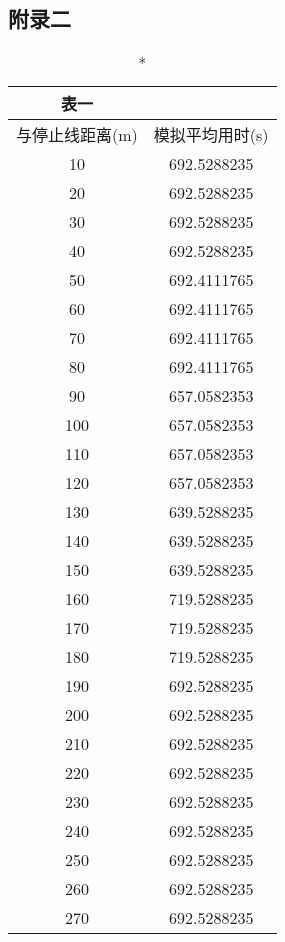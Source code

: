\documentclass[a4paper,12pt]{article}
\numberwithin{equation}{section}
\begin{document}
\begin{appendix}
\section{附录二}
%
\begin{center}
\begin{longtable}{cc}\caption*{表一}
		\\\hline
		与停止线距离(m) & 模拟平均用时(s) \\ \hline
		10 & 692.5288235 \\ \hline
		20 & 692.5288235 \\ \hline
		30 & 692.5288235 \\ \hline
		40 & 692.5288235 \\ \hline
		50 & 692.4111765 \\ \hline
		60 & 692.4111765 \\ \hline
		70 & 692.4111765 \\ \hline
		80 & 692.4111765 \\ \hline
		90 & 657.0582353 \\ \hline
		100 & 657.0582353 \\ \hline
		110 & 657.0582353 \\ \hline
		120 & 657.0582353 \\ \hline
		130 & 639.5288235 \\ \hline
		140 & 639.5288235 \\ \hline
		150 & 639.5288235 \\ \hline
		160 & 719.5288235 \\ \hline
		170 & 719.5288235 \\ \hline
		180 & 719.5288235 \\ \hline
		190 & 692.5288235 \\ \hline
		200 & 692.5288235 \\ \hline
		210 & 692.5288235 \\ \hline
		220 & 692.5288235 \\ \hline
		230 & 692.5288235 \\ \hline
		240 & 692.5288235 \\ \hline
		250 & 692.5288235 \\ \hline
		260 & 692.5288235 \\ \hline
		270 & 692.5288235 \\ \hline

\end{longtable}
\end{center}
\end{appendix}
\end{document}
